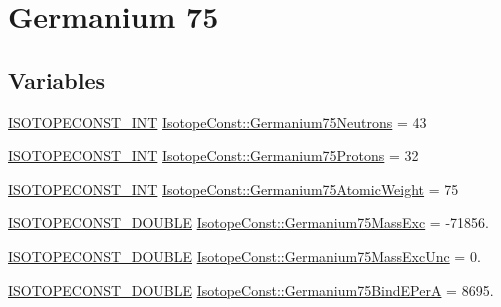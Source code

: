 \hypertarget{group___isotope_const-_germanium-_ge75}{}\section{Germanium 75}
\label{group___isotope_const-_germanium-_ge75}
\subsection*{Variables}
\begin{DoxyCompactItemize}
\item 
\mbox{\hyperlink{group___isotope_const-_macros_ga5f18360b3e99483a35c32d789e62621c}{I\+S\+O\+T\+O\+P\+E\+C\+O\+N\+S\+T\+\_\+\+I\+NT}} \mbox{\hyperlink{group___isotope_const-_germanium-_ge75_gac488f5dfd5b1c55e05b154057dca9867}{Isotope\+Const\+::\+Germanium75\+Neutrons}} = 43
\item 
\mbox{\hyperlink{group___isotope_const-_macros_ga5f18360b3e99483a35c32d789e62621c}{I\+S\+O\+T\+O\+P\+E\+C\+O\+N\+S\+T\+\_\+\+I\+NT}} \mbox{\hyperlink{group___isotope_const-_germanium-_ge75_gadbcc64e194c3afc1a687fac9cc98e4b8}{Isotope\+Const\+::\+Germanium75\+Protons}} = 32
\item 
\mbox{\hyperlink{group___isotope_const-_macros_ga5f18360b3e99483a35c32d789e62621c}{I\+S\+O\+T\+O\+P\+E\+C\+O\+N\+S\+T\+\_\+\+I\+NT}} \mbox{\hyperlink{group___isotope_const-_germanium-_ge75_gae432674adb54659ac0b3bb09eb4b673a}{Isotope\+Const\+::\+Germanium75\+Atomic\+Weight}} = 75
\item 
\mbox{\hyperlink{group___isotope_const-_macros_ga8f45a7272ce02c0b4c65c44636ed719a}{I\+S\+O\+T\+O\+P\+E\+C\+O\+N\+S\+T\+\_\+\+D\+O\+U\+B\+LE}} \mbox{\hyperlink{group___isotope_const-_germanium-_ge75_ga86b0fe0cff3eecdc8026abee40afb1a5}{Isotope\+Const\+::\+Germanium75\+Mass\+Exc}} = -\/71856.
\item 
\mbox{\hyperlink{group___isotope_const-_macros_ga8f45a7272ce02c0b4c65c44636ed719a}{I\+S\+O\+T\+O\+P\+E\+C\+O\+N\+S\+T\+\_\+\+D\+O\+U\+B\+LE}} \mbox{\hyperlink{group___isotope_const-_germanium-_ge75_ga551ec3899b8f533f704ccac506cedec3}{Isotope\+Const\+::\+Germanium75\+Mass\+Exc\+Unc}} = 0.
\item 
\mbox{\hyperlink{group___isotope_const-_macros_ga8f45a7272ce02c0b4c65c44636ed719a}{I\+S\+O\+T\+O\+P\+E\+C\+O\+N\+S\+T\+\_\+\+D\+O\+U\+B\+LE}} \mbox{\hyperlink{group___isotope_const-_germanium-_ge75_ga3743d33995a3914082559204e798dec9}{Isotope\+Const\+::\+Germanium75\+Bind\+E\+PerA}} = 8695.
\item 

\end{DoxyCompactItemize}
